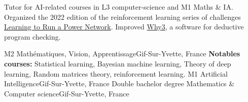 \documentclass[
    10pt,
    A4,
    english,
    draft = false,
    twoside = false,
]{article}
\begin{document}
	
	
	{Tutor for AI-related courses in L3 computer-science and M1 Maths \& IA.}
	{Organized the 2022 edition of the reinforcement learning series of challenges
	 \href{https://l2rpn.chalearn.org/}{Learning to Run a Power Network}.}
	{Improved \href{https://why3.lri.fr/}{Why3}, a software for
	deductive program checking.}
	
	{M2 Mathématiques, Vision, Apprentissage}{Gif-Sur-Yvette, France}
	{{\bf Notables courses:} Statistical learning, Bayesian machine learning, Theory of deep learning,
	Random matrices theory, reinforcement learning.}
	{M1 Artificial Intelligence}{Gif-Sur-Yvette, France}
	{}
	{Double bachelor degree Mathematics \& Computer science}{Gif-Sur-Yvette,
	France}
	{}
	
\end{document}
